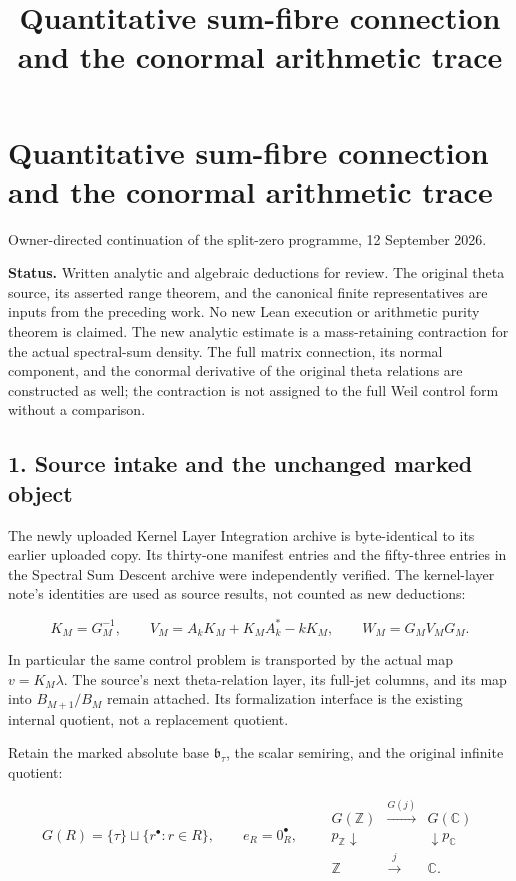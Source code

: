\documentclass[
]{article}
\title{Quantitative sum-fibre connection and the conormal arithmetic
trace}
\author{}
\date{}
\begin{document}
\maketitle

\section{Quantitative sum-fibre connection and the conormal arithmetic
trace}\label{quantitative-sum-fibre-connection-and-the-conormal-arithmetic-trace}

Owner-directed continuation of the split-zero programme, 12 September
2026.

\textbf{Status.} Written analytic and algebraic deductions for review.
The original theta source, its asserted range theorem, and the canonical
finite representatives are inputs from the preceding work. No new Lean
execution or arithmetic purity theorem is claimed. The new analytic
estimate is a mass-retaining contraction for the actual spectral-sum
density. The full matrix connection, its normal component, and the
conormal derivative of the original theta relations are constructed as
well; the contraction is not assigned to the full Weil control form
without a comparison.

\subsection{1. Source intake and the unchanged marked
object}\label{source-intake-and-the-unchanged-marked-object}

The newly uploaded Kernel Layer Integration archive is byte-identical to
its earlier uploaded copy. Its thirty-one manifest entries and the
fifty-three entries in the Spectral Sum Descent archive were
independently verified. The kernel-layer note's identities are used as
source results, not counted as new deductions:

\[K_M=G_M^{-1},\qquad V_M=A_kK_M+K_MA_k^*-kK_M,\qquad W_M=G_MV_MG_M.\tag{1.1}\]

In particular the same control problem is transported by the actual map
\(v=K_M\lambda\). The source's next theta-relation layer, its full-jet
columns, and its map into \(B_{M+1}/B_M\) remain attached. Its
formalization interface is the existing internal quotient, not a
replacement quotient.

Retain the marked absolute base \(\mathfrak b_\tau\), the scalar
semiring, and the original infinite quotient:

\[G(R)=\{\tau\}\sqcup\{r^\bullet:r\in R\},\qquad e_R=0_R^\bullet,\qquad
\begin{array}{ccc}G(\mathbb Z)&\xrightarrow{G(j)}&G(\mathbb C)\\
p_{\mathbb Z}\downarrow&&\downarrow p_{\mathbb C}\\
\mathbb Z&\xrightarrow{j}&\mathbb C.
\end{array}\tag{1.2}\]
\end{document}
